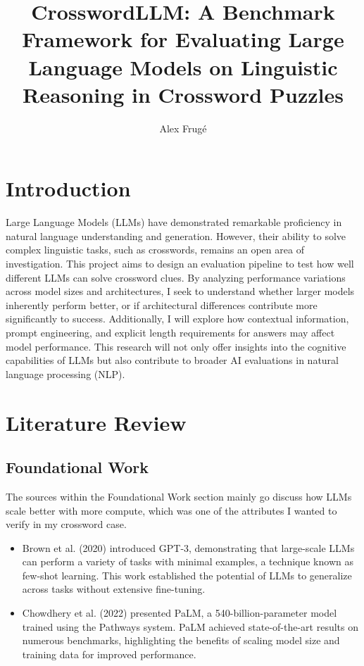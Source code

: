 \documentclass[
	a4paper, %
	10pt, %
	unnumberedsections, %
	twoside, %
]{LTJournalArticle}
\title{CrosswordLLM: A Benchmark Framework for Evaluating Large Language Models on Linguistic Reasoning in Crossword Puzzles} %
\author{%
	Alex Frugé
}
\begin{document}
\maketitle %


\section{Introduction}

Large Language Models (LLMs) have demonstrated remarkable proficiency in natural language
understanding and generation. However, their ability to solve complex linguistic tasks, such as crosswords, remains an open area of investigation. This project aims to design an evaluation pipeline to test how well different LLMs can solve crossword clues. By analyzing performance variations across model sizes and architectures, I seek to understand whether larger models inherently perform better, or if architectural differences contribute more significantly to success. Additionally, I will explore how contextual information, prompt engineering, and explicit length requirements for answers may affect model performance. This research will not only offer insights into the cognitive capabilities of LLMs but also contribute to broader AI evaluations in natural language processing (NLP).


\section{Literature Review}

\subsection{Foundational Work}

The sources within the Foundational Work section mainly go discuss how LLMs scale better with more compute, which was one of the attributes I wanted to verify in my crossword case.

\begin{itemize}
	\item Brown et al. (2020) \cite{brown2020language} introduced GPT-3, demonstrating that large-scale LLMs can perform a variety of tasks with minimal examples, a technique known as few-shot learning. This work established the potential of LLMs to generalize across tasks without extensive fine-tuning.
	\item Chowdhery et al. (2022) \cite{chowdhery2022palm} presented PaLM, a 540-billion-parameter model trained using the Pathways system. PaLM achieved state-of-the-art results on numerous benchmarks, highlighting the benefits of scaling model size and training data for improved performance.
\end{itemize}
\end{document}
